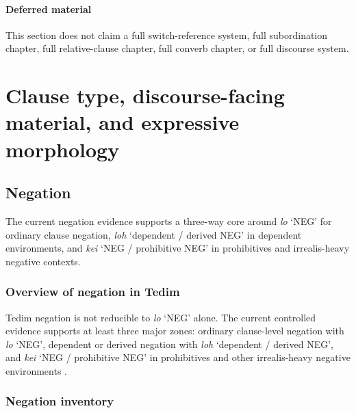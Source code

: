 \documentclass[
  11pt,
  a4paper,
]{article}
\newcommand{\tdim}[1]{\textit{#1}}
\newcommand{\glossquote}[1]{`#1'}
\newcounter{reviewchapter}
\newcommand{\reviewchapterbreak}{\stepcounter{reviewchapter}\setcounter{xnumi}{0}}
\begin{document}
\paragraph{Deferred material}\label{deferred-material-8}

This section does not claim a full switch-reference system, full
subordination chapter, full relative-clause chapter, full converb
chapter, or full discourse system.

\reviewchapterbreak

\section{Clause type, discourse-facing material, and expressive
morphology}\label{clause-type-discourse-facing-material-and-expressive-morphology}

\subsection{Negation}\label{negation}

The current negation evidence supports a three-way core around \tdim{lo}
\glossquote{NEG} for ordinary clause negation, \tdim{loh}
\glossquote{dependent / derived NEG} in dependent environments, and
\tdim{kei} \glossquote{NEG / prohibitive NEG} in prohibitives and
irrealis-heavy negative contexts.

\subsubsection{Overview of negation in
Tedim}\label{overview-of-negation-in-tedim}

Tedim negation is not reducible to \tdim{lo} \glossquote{NEG} alone. The
current controlled evidence supports at least three major zones:
ordinary clause-level negation with \tdim{lo} \glossquote{NEG},
dependent or derived negation with \tdim{loh}
\glossquote{dependent / derived NEG}, and \tdim{kei}
\glossquote{NEG / prohibitive NEG} in prohibitives and other
irrealis-heavy negative environments
\citep{henderson1965, zamngaihcing2017}.

\subsubsection{Negation inventory}\label{negation-inventory}
\end{document}
